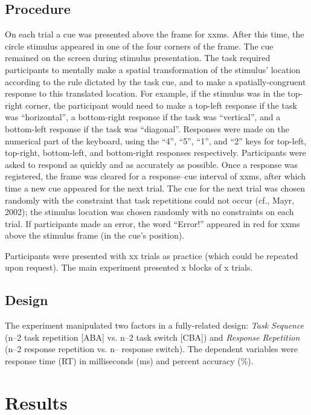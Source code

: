 \documentclass[a4paper, doc, natbib]{apa6}
\begin{document}
\subsection{Procedure}
On each trial a cue was presented above the frame for xxms. After this time, the circle stimulus appeared in one of the four corners of the frame. The cue remained on the screen during stimulus presentation. The task required participants to mentally make a spatial transformation of the stimulus' location according to the rule dictated by the task cue, and to make a spatially-congruent response to this translated location. For example, if the stimulus was in the top-right corner, the participant would need to make a top-left response if the task was ``horizontal'', a bottom-right response if the task was ``vertical'', and a bottom-left response if the task was ``diagonal''. Responses were made on the numerical part of the keyboard, using the ``4'', ``5'', ``1'', and ``2'' keys for top-left, top-right, bottom-left, and bottom-right responses respectively. Participants were asked to respond as quickly and as accurately as possible. Once a response was registered, the frame was cleared for a response--cue interval of xxms, after which time a new cue appeared for the next trial. The cue for the next trial was chosen randomly with the constraint that task repetitions could not occur (cf., Mayr, 2002); the stimulus location was chosen randomly with no constraints on each trial. If participants made an error, the word ``Error!'' appeared in red for xxms above the stimulus frame (in the cue's position).

Participants were presented with xx trials as practice (which could be repeated upon request). The main experiment presented x blocks of x trials. 

\subsection{Design}
The experiment manipulated two factors in a fully-related design: \emph{Task Sequence} (n--2 task repetition [ABA] vs. n--2 task switch [CBA]) and \emph{Response Repetition} (n--2 response repetition vs. n-- response switch). The dependent variables were response time (RT) in milliseconds (ms) and percent accuracy (\%).


\section{Results}
\end{document}
